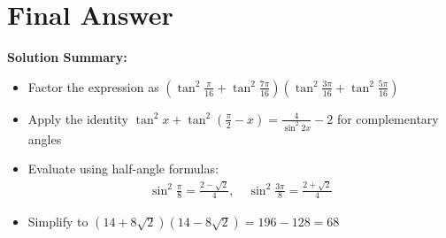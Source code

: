 \documentclass[12pt]{article}
\begin{document}
\section{Final Answer}

\begin{center}
\Large
{}
\end{center}

\textbf{Solution Summary:}
\begin{itemize}
    \item Factor the expression as $\left(\tan^2\frac{\pi}{16}+\tan^2 \frac{7\pi}{16}\right)\left(\tan^2\frac{3\pi}{16}+\tan^2 \frac{5\pi}{16}\right)$
    \item Apply the identity $\tan^2 x + \tan^2(\frac{\pi}{2}-x) = \frac{4}{\sin^2 2x} - 2$ for complementary angles
    \item Evaluate using half-angle formulas:
    \begin{align*}
    \sin^2\frac{\pi}{8} = \frac{2-\sqrt{2}}{4}, \quad \sin^2\frac{3\pi}{8} = \frac{2+\sqrt{2}}{4}
    \end{align*}
    \item Simplify to $(14+8\sqrt{2})(14-8\sqrt{2}) = 196 - 128 = 68$
\end{itemize}
\end{document}
